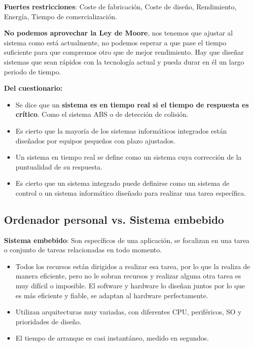 \documentclass[12pt, twoside, openright]{report} %
\begin{document}
\textbf{Fuertes restricciones}: Coste de fabricación, Coste de diseño, Rendimiento, Energía, Tiempo de comercialización.

\textbf{No podemos aprovechar la Ley de Moore}, nos tenemos que ajustar
al sistema como está actualmente, no podemos esperar a que pase el
tiempo suficiente para que compremos otro que de mejor rendimiento. Hay
que diseñar sistemas que sean rápidos con la tecnología actual y pueda
durar en él un largo periodo de tiempo.

\textbf{Del cuestionario:}

\begin{itemize}
	\item Se dice que un \textbf{sistema es en tiempo real si el tiempo de
		      respuesta es crítico}. Como el sistema ABS o de detección de colisión.
	\item Es cierto que la mayoría de los sistemas informáticos integrados están
	      diseñados por equipos pequeños con plazo ajustados.
	\item Un sistema en tiempo real se define como un sistema cuya corrección de
	      la puntualidad de su respuesta.
	\item Es cierto que un sistema integrado puede definirse como un sistema de
	      control o un sistema informático diseñado para realizar una tarea
	      específica.
\end{itemize}

\subsection{Ordenador personal vs. Sistema
	embebido}

\textbf{Sistema embebido}: Son específicos de una aplicación, se
focalizan en una tarea o conjunto de tareas relacionadas en todo
momento.

\begin{itemize}
	\item Todos los recursos están dirigidos a realizar esa tarea, por lo que la
	      realiza de manera eficiente, pero no le sobran recursos y realizar alguna otra tarea es
	      muy difícil o imposible. El software y hardware lo diseñan juntos por
	      lo que es más eficiente y fiable, se adaptan al hardware
	      perfectamente.
	\item Utilizan arquitecturas muy variadas, con diferentes CPU, periféricos,
	      SO y prioridades de diseño.
	\item El tiempo de arranque es casi instantáneo, medido en segundos.
\end{itemize}
\end{document}
